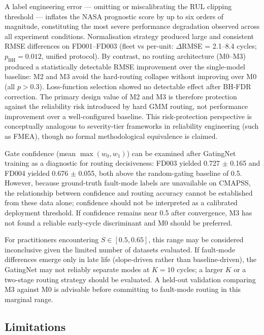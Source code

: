 \documentclass[review,12pt]{elsarticle}
\begin{document}
A label engineering error --- omitting or miscalibrating the RUL clipping threshold --- inflates the NASA prognostic score by up to six orders of magnitude, constituting the most severe performance degradation observed across all experiment conditions. Normalisation strategy produced large and consistent RMSE differences on FD001--FD003 (fleet vs per-unit: $\Delta$RMSE = 2.1--8.4 cycles; $p_\text{BH} = 0.012$, unified protocol). By contrast, no routing architecture (M0--M3) produced a statistically detectable RMSE improvement over the single-model baseline: M2 and M3 avoid the hard-routing collapse without improving over M0 (all $p > 0.3$). Loss-function selection showed no detectable effect after BH-FDR correction. The primary design value of M2 and M3 is therefore protection against the reliability risk introduced by hard GMM routing, not performance improvement over a well-configured baseline. This risk-protection perspective is conceptually analogous to severity-tier frameworks in reliability engineering (such as FMEA), though no formal methodological equivalence is claimed.

Gate confidence (mean $\max(w_0, w_1)$) can be examined after GatingNet training as a diagnostic for routing decisiveness: FD003 yielded 0.727 $\pm$ 0.165 and FD004 yielded 0.676 $\pm$ 0.055, both above the random-gating baseline of 0.5. However, because ground-truth fault-mode labels are unavailable on CMAPSS, the relationship between confidence and routing accuracy cannot be established from these data alone; confidence should not be interpreted as a calibrated deployment threshold. If confidence remains near 0.5 after convergence, M3 has not found a reliable early-cycle discriminant and M0 should be preferred.

For practitioners encountering $S \in [0.5, 0.65]$, this range may be considered inconclusive given the limited number of datasets evaluated. If fault-mode differences emerge only in late life (slope-driven rather than baseline-driven), the GatingNet may not reliably separate modes at $K = 10$ cycles; a larger $K$ or a two-stage routing strategy should be evaluated. A held-out validation comparing M3 against M0 is advisable before committing to fault-mode routing in this marginal range.

\subsection{Limitations}
\end{document}
